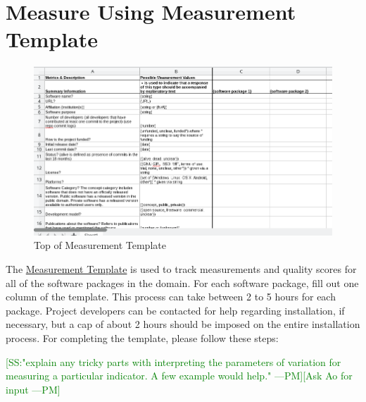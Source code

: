 \documentclass[letterpaper,cleveref]{lipics-v2019}
\newcommand{\authornote}[3]{\textcolor{#1}{[#3 ---#2]}}
\newcommand{\authornote}[3]{}
\newcommand{\pmi}[1]{\authornote{green}{PM}{#1}} %
\theoremstyle{definition}
\begin{document}
\section{Measure Using Measurement Template} \label{SecShallowMeasure}

\begin{figure}[h!]
	\begin{center}
		\includegraphics[width=1.0\textwidth]{measurement_template}
		\caption{Top of Measurement Template}
		\label{measurement_template_image}

	\end{center}
\end{figure}

The \href{https://github.com/smiths/AIMSS/blob/master/StateOfPractice/Methodology/Combined_MeasurementTemplate_EmpiricalMeasures.xlsx}{Measurement Template} is used to track measurements and quality scores for all of the software packages in the domain. For each software package, fill out one column of the template. This process can take between 2 to 5 hours for each package.
Project developers can be contacted for help regarding installation, if necessary, but a cap of about 2 hours should be imposed on the entire installation process. For completing the template, please follow these steps:

\pmi{SS:"explain any tricky parts with interpreting the parameters of variation for measuring a particular indicator. A few example would help."}\pmi{Ask Ao for input}
\end{document}
